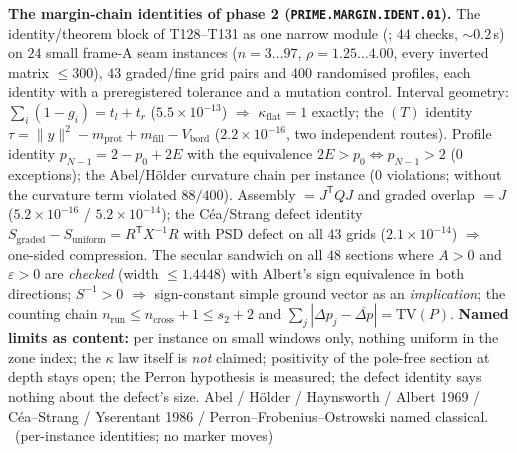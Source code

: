 \documentclass[11pt,a4paper]{article}
\theoremstyle{definition}
\begin{document}
\par\smallskip\noindent\textbf{The margin-chain identities of phase 2
(\texttt{PRIME.MARGIN.IDENT.01}).}
The identity/theorem block of T128--T131 as one narrow module
(; $44$ checks, ${\sim}0.2$\,s) on $24$
small frame-A seam instances ($n=3\ldots97$, $\rho=1.25\ldots4.00$, every
inverted matrix $\le300$), $43$ graded/fine grid pairs and $400$ randomised
profiles, each identity with a preregistered tolerance and a mutation control.
Interval geometry: $\sum_i(1-g_i)=t_l+t_r$ ($5.5\times10^{-13}$) $\Rightarrow$
$\kappa_{\mathrm{flat}}=1$ exactly; the $(T)$ identity
$\tau=\|y\|^2-m_{\mathrm{prot}}+m_{\mathrm{fill}}-V_{\mathrm{bord}}$
($2.2\times10^{-16}$, two independent routes). Profile identity
$p_{N-1}=2-p_0+2E$ with the equivalence $2E>p_0\iff p_{N-1}>2$ ($0$ exceptions);
the Abel/H\"older curvature chain per instance ($0$ violations; without the
curvature term violated $88/400$). Assembly $=J^{\mathsf T}QJ$ and graded
overlap $=J$ ($5.2\times10^{-16}$ / $5.2\times10^{-14}$); the C\'ea/Strang
defect identity
$S_{\mathrm{graded}}-S_{\mathrm{uniform}}=R^{\mathsf T}X^{-1}R$ with PSD defect
on all $43$ grids ($2.1\times10^{-14}$) $\Rightarrow$ one-sided compression.
The secular sandwich on all $48$ sections where $A>0$ and $\varepsilon>0$ are
\emph{checked} (width $\le1.4448$) with Albert's sign equivalence in both
directions; $S^{-1}>0$ $\Rightarrow$ sign-constant simple ground vector as an
\emph{implication}; the counting chain
$n_{\mathrm{run}}\le n_{\mathrm{cross}}+1\le s_2+2$ and
$\sum_j|\Delta p_j-\overline{\Delta p}|=\mathrm{TV}(P)$.
\textbf{Named limits as content:} per instance on small windows only, nothing
uniform in the zone index; the $\kappa$ law itself is \emph{not} claimed;
positivity of the pole-free section at depth stays open; the Perron hypothesis is
measured; the defect identity says nothing about the defect's size.
Abel / H\"older / Haynsworth / Albert 1969 / C\'ea--Strang / Yserentant 1986 /
Perron--Frobenius--Ostrowski named classical.
\mE\ (per-instance identities; no marker moves)
\par\smallskip
\end{document}
